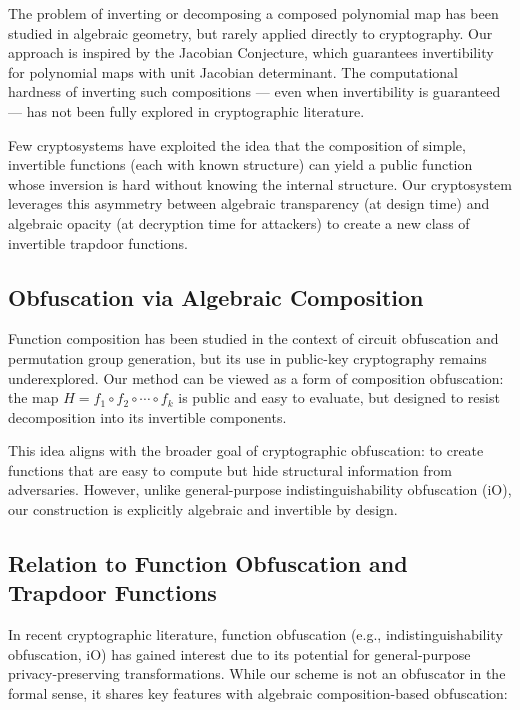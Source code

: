 \documentclass[12pt]{article}
\begin{document}
The problem of inverting or decomposing a composed polynomial map has been studied in algebraic geometry, but rarely applied directly to cryptography. Our approach is inspired by the Jacobian Conjecture, which guarantees invertibility for polynomial maps with unit Jacobian determinant. The computational hardness of inverting such compositions — even when invertibility is guaranteed — has not been fully explored in cryptographic literature.

Few cryptosystems have exploited the idea that the composition of simple, invertible functions (each with known structure) can yield a public function whose inversion is hard without knowing the internal structure. Our cryptosystem leverages this asymmetry between algebraic transparency (at design time) and algebraic opacity (at decryption time for attackers) to create a new class of invertible trapdoor functions.

\subsection*{Obfuscation via Algebraic Composition}

Function composition has been studied in the context of circuit obfuscation and permutation group generation, but its use in public-key cryptography remains underexplored. Our method can be viewed as a form of composition obfuscation: the map \( H = f_1 \circ f_2 \circ \cdots \circ f_k \) is public and easy to evaluate, but designed to resist decomposition into its invertible components.

This idea aligns with the broader goal of cryptographic obfuscation: to create functions that are easy to compute but hide structural information from adversaries. However, unlike general-purpose indistinguishability obfuscation (iO), our construction is explicitly algebraic and invertible by design.

\subsection*{Relation to Function Obfuscation and Trapdoor Functions}

In recent cryptographic literature, function obfuscation (e.g., indistinguishability obfuscation, iO) has gained interest due to its potential for general-purpose privacy-preserving transformations. While our scheme is not an obfuscator in the formal sense, it shares key features with algebraic composition-based obfuscation:
\end{document}
